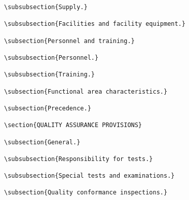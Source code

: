 \begin{itemize}
\begin{small}
\begin{verbatim}
\subsubsection{Supply.}

\subsubsection{Facilities and facility equipment.}

\subsection{Personnel and training.}

\subsubsection{Personnel.}

\subsubsection{Training.}

\subsection{Functional area characteristics.}

\subsection{Precedence.}

\section{QUALITY ASSURANCE PROVISIONS}

\subsection{General.}

\subsubsection{Responsibility for tests.}

\subsubsection{Special tests and examinations.}

\subsection{Quality conformance inspections.}


\end{verbatim}
\end{small}
\end{itemize}
